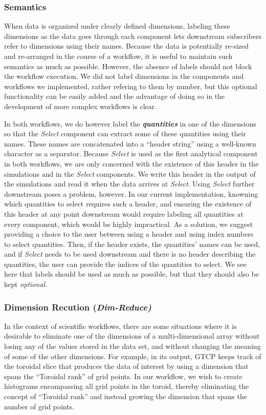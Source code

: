 \documentclass[conference]{IEEEtran}
\begin{document}
\subsubsection{Semantics}

When data is organized under clearly defined dimensions, labeling these
dimensions as the data goes through each component lets downstream subscribers
refer to dimensions using their names. Because the data is potentially re-sized
and re-arranged in the course of a workflow, it is useful to maintain such
semantics as much as possible. However, the absence of labels should not block
the workflow execution. We did not label dimensions in the components and
workflows we implemented, rather refering to them by number, but this optional
functionality can be easily added and the advantage of doing so in the
development of more complex workflows is clear.

In both workflows, we do however label the \textbf{\em quantities} in one of
the dimensions so that the {\em Select} component can extract some of these
quantities using their names. These names are concatenated into a ``header
string'' using a well-known character as a separator. Because {\em Select} is
used as the first analytical component in both workflows, we are only concerned
with the existence of this header in the simulations and in the {\em Select}
components. We write this header in the output of the simulations and read it
when the data arrives at {\em Select}.  Using {\em Select} further downstream
poses a problem, however. In our current implementation, knowning which
quantities to select requires such a header, and ensuring the existence of this
header at any point downstream would require labeling all quantities at every
component, which would be highly impractical.  As a solution, we suggest
providing a choice to the user between using a header and using index numbers
to select quantities. Then, if the header exists, the quantities' names can be
used, and if {\em Select} needs to be used downstream and there is no header
describing the quantities, the user can provide the indices of the quantities
to select. We see here that labels should be used as much as possible, but that
they should also be kept {\em optional}.

\subsubsection{Dimension Recution (\em Dim-Reduce)}

In the context of scientific workflows, there are some situations where it is
desirable to eliminate one of the dimensions of a multi-dimensional array
without losing any of the values stored in the data set, and without changing
the meaning of some of the other dimensions. For example, in its output, GTCP
keeps track of the toroidal slice that produces the data of interest by using a
dimension that spans the ``Toroidal rank'' of grid points. In our workflow, we
wish to create histograms encompassing all grid points in the toroid, thereby
eliminating the concept of ``Toroidal rank'' and instead growing the dimension
that spans the number of grid points.
\end{document}
